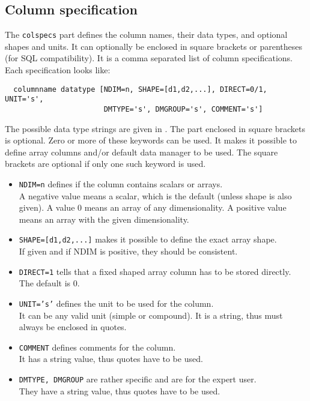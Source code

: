 \subsection{Column specification}
The \texttt{colspecs} part defines the column names, their data types,
and optional shapes and units. It can optionally be enclosed in square
brackets or parentheses (for SQL compatibility).
It is a comma separated list of column specifications.
Each specification looks like:
\begin{verbatim}
  columnname datatype [NDIM=n, SHAPE=[d1,d2,...], DIRECT=0/1, UNIT='s',
                       DMTYPE='s', DMGROUP='s', COMMENT='s']
\end{verbatim}
The possible data type strings are given in
.
The part enclosed in square brackets is optional. Zero or more of
these keywords can be used. It makes it possible
to define array columns and/or default data manager to be used.
The square brackets are optional if only one such keyword is used.
\begin{itemize}
\item \texttt{NDIM=n} defines if the column contains scalars or arrays.
\\A negative value means a scalar, which is the default (unless shape is also given).
A value 0 means an array of any dimensionality. A positive value means
an array with the given dimensionality.
\item \texttt{SHAPE=[d1,d2,...]} makes it possible to define the exact
array shape.
\\If given and if NDIM is positive, they should be consistent.
\item \texttt{DIRECT=1} tells that a fixed shaped array column has to be
  stored directly. The default is 0.
\item \texttt{UNIT='s'} defines the unit to be used for the column.
\\It can be any valid unit (simple or compound). It is a string,
thus must always be enclosed in quotes. 
\item \texttt{COMMENT} defines comments for the column.
\\It has a string value, thus quotes
have to be used.
\item \texttt{DMTYPE, DMGROUP} are rather specific and are for the expert user.
\\They have a string value, thus quotes
have to be used.
\end{itemize}

